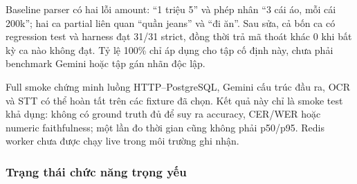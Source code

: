 Baseline parser có hai lỗi amount: ``1 triệu 5'' và phép nhân ``3 cái áo, mỗi cái 200k''; hai ca partial liên quan ``quần jeans'' và ``đi ăn''. Sau sửa, cả bốn ca có regression test và harness đạt 31/31 strict, đồng thời trả mã thoát khác 0 khi bất kỳ ca nào không đạt. Tỷ lệ 100\% chỉ áp dụng cho tập cố định này, chưa phải benchmark Gemini hoặc tập gán nhãn độc lập.

Full smoke chứng minh luồng HTTP--PostgreSQL, Gemini cấu trúc đầu ra, OCR và STT có thể hoàn tất trên các fixture đã chọn. Kết quả này chỉ là smoke test khả dụng: không có ground truth đủ để suy ra accuracy, CER/WER hoặc numeric faithfulness; một lần đo thời gian cũng không phải p50/p95. Redis worker chưa được chạy live trong môi trường ghi nhận.

\subsubsection{Trạng thái chức năng trọng yếu}

